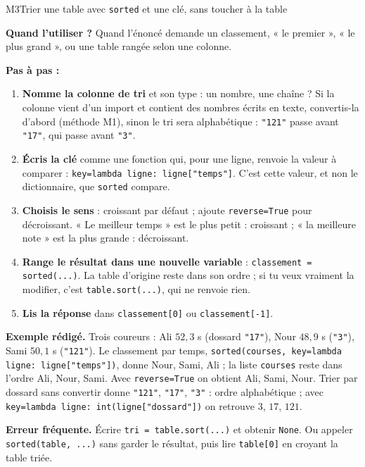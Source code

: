 \begin{fichemethode}{M3}{Trier une table avec \texttt{sorted} et une clé, sans toucher à la table}

\textbf{Quand l'utiliser ?} Quand l'énoncé demande un classement, « le premier », « le plus
grand », ou une table rangée selon une colonne.

\textbf{Pas à pas :}
\begin{enumerate}
  \item \textbf{Nomme la colonne de tri} et son type : un nombre, une chaîne ? Si la colonne
        vient d'un import et contient des nombres écrits en texte, convertis-la d'abord
        (méthode M1), sinon le tri sera alphabétique : \lstinline{"121"} passe avant
        \lstinline{"17"}, qui passe avant \lstinline{"3"}.
  \item \textbf{Écris la clé} comme une fonction qui, pour une ligne, renvoie la valeur à
        comparer : \lstinline{key=lambda ligne: ligne["temps"]}. C'est cette valeur, et non
        le dictionnaire, que \lstinline{sorted} compare.
  \item \textbf{Choisis le sens} : croissant par défaut ; ajoute \lstinline{reverse=True}
        pour décroissant. « Le meilleur temps » est le plus petit : croissant ; « la
        meilleure note » est la plus grande : décroissant.
  \item \textbf{Range le résultat dans une nouvelle variable} :
        \lstinline{classement = sorted(...)}. La table d'origine reste dans son ordre ; si
        tu veux vraiment la modifier, c'est \lstinline{table.sort(...)}, qui ne renvoie rien.
  \item \textbf{Lis la réponse} dans \lstinline{classement[0]} ou \lstinline{classement[-1]}.
\end{enumerate}

\textbf{Exemple rédigé.} Trois coureurs : Ali $52{,}3$ s (dossard \lstinline{"17"}), Nour
$48{,}9$ s (\lstinline{"3"}), Sami $50{,}1$ s (\lstinline{"121"}). Le classement par temps,
\lstinline{sorted(courses, key=lambda ligne: ligne["temps"])}, donne Nour, Sami, Ali ; la
liste \lstinline{courses} reste dans l'ordre Ali, Nour, Sami. Avec \lstinline{reverse=True}
on obtient Ali, Sami, Nour. Trier par dossard sans convertir donne \lstinline{"121"},
\lstinline{"17"}, \lstinline{"3"} : ordre alphabétique ; avec
\lstinline{key=lambda ligne: int(ligne["dossard"])} on retrouve $3$, $17$, $121$.

\textbf{Erreur fréquente.} Écrire \lstinline{tri = table.sort(...)} et obtenir
\lstinline{None}. Ou appeler \lstinline{sorted(table, ...)} sans garder le résultat, puis
lire \lstinline{table[0]} en croyant la table triée.

\end{fichemethode}
